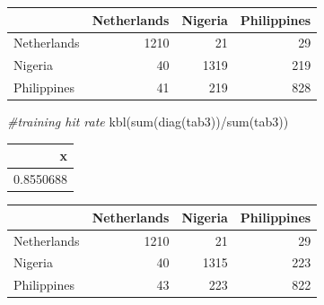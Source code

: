 \documentclass[
  11pt,
]{article}
\newenvironment{Shaded}{\begin{snugshade}}{\end{snugshade}}
\newcommand{\AttributeTok}[1]{\textcolor[rgb]{0.77,0.63,0.00}{#1}}
\newcommand{\CommentTok}[1]{\textcolor[rgb]{0.56,0.35,0.01}{\textit{#1}}}
\newcommand{\ConstantTok}[1]{\textcolor[rgb]{0.00,0.00,0.00}{#1}}
\newcommand{\DecValTok}[1]{\textcolor[rgb]{0.00,0.00,0.81}{#1}}
\newcommand{\FunctionTok}[1]{\textcolor[rgb]{0.00,0.00,0.00}{#1}}
\newcommand{\NormalTok}[1]{#1}
\newcommand{\OtherTok}[1]{\textcolor[rgb]{0.56,0.35,0.01}{#1}}
\newcommand{\SpecialCharTok}[1]{\textcolor[rgb]{0.00,0.00,0.00}{#1}}
\begin{document}
\begin{tabular}[t]{l|r|r|r}
\hline
  & Netherlands & Nigeria & Philippines\\
\hline
Netherlands & 1210 & 21 & 29\\
\hline
Nigeria & 40 & 1319 & 219\\
\hline
Philippines & 41 & 219 & 828\\
\hline
\end{tabular}

\begin{Shaded}
\begin{Highlighting}[]
\CommentTok{\#training hit rate}
\FunctionTok{kbl}\NormalTok{(}\FunctionTok{sum}\NormalTok{(}\FunctionTok{diag}\NormalTok{(tab3))}\SpecialCharTok{/}\FunctionTok{sum}\NormalTok{(tab3))}
\end{Highlighting}
\end{Shaded}

\begin{tabular}[t]{r}
\hline
x\\
\hline
0.8550688\\
\hline
\end{tabular}

\begin{Shaded}
\end{Shaded}

\begin{tabular}[t]{l|r|r|r}
\hline
  & Netherlands & Nigeria & Philippines\\
\hline
Netherlands & 1210 & 21 & 29\\
\hline
Nigeria & 40 & 1315 & 223\\
\hline
Philippines & 43 & 223 & 822\\
\hline
\end{tabular}
\end{document}
